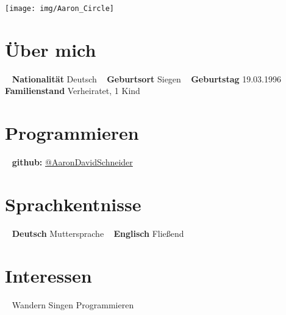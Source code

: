 \documentclass[]{friggeri-cv}
\begin{document}



\begin{aside}
  \texttt{[image: img/Aaron\_Circle]}
\section{Über mich}
~  
\textbf{Nationalität}
  Deutsch
   ~
  \textbf{Geburtsort}
  Siegen
  ~
  \textbf{Geburtstag}
  19.03.1996
  ~  
  \textbf{Familienstand}
  Verheiratet, 1 Kind
  \section{Programmieren}
  ~
    \textbf{github:} 
    \href{https://github.com/AaronDavidSchneider/}{@AaronDavidSchneider}
     \section{Sprachkentnisse}
	  ~
    \textbf{Deutsch}
    Muttersprache
    ~
    \textbf{Englisch}
    Fließend
 \section{Interessen}
 ~
 Wandern
 Singen
 Programmieren
\end{aside}
\end{document}
